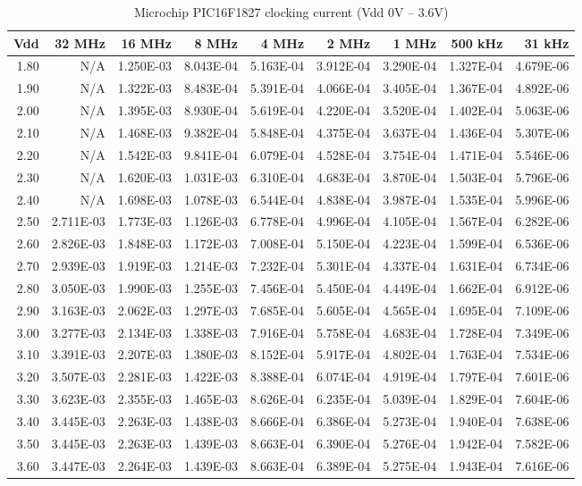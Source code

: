 \begin{table}
\begin{centering}
\begin{tabular}{|r|r|r|r|r|r|r|r|r|}
\hline
Vdd  & 32 MHz  & 16 MHz  & 8 MHz  & 4 MHz  & 2 MHz  & 1 MHz  & 500 kHz  & 31 kHz \tabularnewline
\hline
1.80  & N/A  & 1.250E-03  & 8.043E-04  & 5.163E-04  & 3.912E-04  & 3.290E-04  & 1.327E-04  & 4.679E-06 \tabularnewline
1.90  & N/A  & 1.322E-03  & 8.483E-04  & 5.391E-04  & 4.066E-04  & 3.405E-04  & 1.367E-04  & 4.892E-06 \tabularnewline
2.00  & N/A  & 1.395E-03  & 8.930E-04  & 5.619E-04  & 4.220E-04  & 3.520E-04  & 1.402E-04  & 5.063E-06 \tabularnewline
2.10  & N/A  & 1.468E-03  & 9.382E-04  & 5.848E-04  & 4.375E-04  & 3.637E-04  & 1.436E-04  & 5.307E-06 \tabularnewline
2.20  & N/A  & 1.542E-03  & 9.841E-04  & 6.079E-04  & 4.528E-04  & 3.754E-04  & 1.471E-04  & 5.546E-06 \tabularnewline
2.30  & N/A  & 1.620E-03  & 1.031E-03  & 6.310E-04  & 4.683E-04  & 3.870E-04  & 1.503E-04  & 5.796E-06 \tabularnewline
2.40  & N/A  & 1.698E-03  & 1.078E-03  & 6.544E-04  & 4.838E-04  & 3.987E-04  & 1.535E-04  & 5.996E-06 \tabularnewline
2.50  & 2.711E-03  & 1.773E-03  & 1.126E-03  & 6.778E-04  & 4.996E-04  & 4.105E-04  & 1.567E-04  & 6.282E-06 \tabularnewline
2.60  & 2.826E-03  & 1.848E-03  & 1.172E-03  & 7.008E-04  & 5.150E-04  & 4.223E-04  & 1.599E-04  & 6.536E-06 \tabularnewline
2.70  & 2.939E-03  & 1.919E-03  & 1.214E-03  & 7.232E-04  & 5.301E-04  & 4.337E-04  & 1.631E-04  & 6.734E-06 \tabularnewline
2.80  & 3.050E-03  & 1.990E-03  & 1.255E-03  & 7.456E-04  & 5.450E-04  & 4.449E-04  & 1.662E-04  & 6.912E-06 \tabularnewline
2.90  & 3.163E-03  & 2.062E-03  & 1.297E-03  & 7.685E-04  & 5.605E-04  & 4.565E-04  & 1.695E-04  & 7.109E-06 \tabularnewline
3.00  & 3.277E-03  & 2.134E-03  & 1.338E-03  & 7.916E-04  & 5.758E-04  & 4.683E-04  & 1.728E-04  & 7.349E-06 \tabularnewline
3.10  & 3.391E-03  & 2.207E-03  & 1.380E-03  & 8.152E-04  & 5.917E-04  & 4.802E-04  & 1.763E-04  & 7.534E-06 \tabularnewline
3.20  & 3.507E-03  & 2.281E-03  & 1.422E-03  & 8.388E-04  & 6.074E-04  & 4.919E-04  & 1.797E-04  & 7.601E-06 \tabularnewline
3.30  & 3.623E-03  & 2.355E-03  & 1.465E-03  & 8.626E-04  & 6.235E-04  & 5.039E-04  & 1.829E-04  & 7.604E-06 \tabularnewline
3.40  & 3.445E-03  & 2.263E-03  & 1.438E-03  & 8.666E-04  & 6.386E-04  & 5.273E-04  & 1.940E-04  & 7.638E-06 \tabularnewline
3.50  & 3.445E-03  & 2.263E-03  & 1.439E-03  & 8.663E-04  & 6.390E-04  & 5.276E-04  & 1.942E-04  & 7.582E-06 \tabularnewline
3.60  & 3.447E-03  & 2.264E-03  & 1.439E-03  & 8.663E-04  & 6.389E-04  & 5.275E-04  & 1.943E-04  & 7.616E-06 \tabularnewline
\hline
\end{tabular}
\par\end{centering}

\protect\caption{Microchip PIC16F1827 clocking current (Vdd 0V -- 3.6V)}


\end{table}
